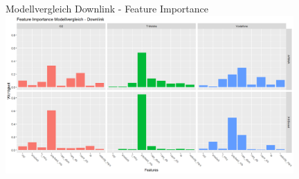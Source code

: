 \begin{frame}{Modellvergleich Downlink - Feature Importance}
\includegraphics[width = 11cm]{plots/feature_importance_modellvergleich_downlink}
\end{frame}





